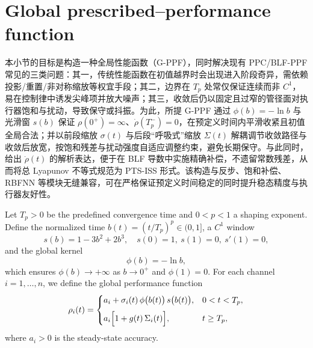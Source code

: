 \documentclass[pdflatex,sn-mathphys-num]{sn-jnl}%
\theoremstyle{thmstyleone}%
\theoremstyle{thmstyletwo}%
\theoremstyle{thmstylethree}%
\begin{document}
\section{Global prescribed–performance function}


本小节的目标是构造一种全局性能函数（G-PPF），同时解决现有 PPC/BLF-PPF 常见的三类问题：其一，传统性能函数在初值越界时会出现进入阶段奇异，需依赖投影/重置/非对称缩放等权宜手段；其二，边界在 $T_p$ 处常仅保证连续而非 $C^1$，易在控制律中诱发尖峰项并放大噪声；其三，收敛后仍以固定且过窄的管径面对执行器饱和与扰动，导致保守或抖振。为此，所提 G-PPF 通过 $\phi(b)=-\ln b$ 与光滑窗 $s(b)$ 保证 $\rho(0^+)=\infty$、$\dot\rho(T_p^-)=0$，在预定义时间内平滑收紧且初值全局合法；并以前段缩放 $\sigma(t)$ 与后段“呼吸式”缩放 $\Sigma(t)$ 解耦调节收敛路径与收敛后放宽，按饱和残差与扰动强度自适应调整约束，避免长期保守。与此同时，给出 $\dot\rho(t)$ 的解析表达，便于在 BLF 导数中实施精确补偿，不遗留常数残差，从而将总 Lyapunov 不等式规范为 PTS-ISS 形式。该构造与反步、饱和补偿、RBFNN 等模块无缝兼容，可在严格保证预定义时间稳定的同时提升稳态精度与执行器友好性。

Let $T_p>0$ be the predefined convergence time and $0<p<1$ a shaping exponent.
Define the normalized time $b(t)=(t/T_p)^p\in(0,1]$, a $C^1$ window
\begin{equation}\label{eq:gppf-window}
s(b)=1-3b^2+2b^3,\quad s(0)=1,\ s(1)=0,\ s'(1)=0,
\end{equation}
and the global kernel
\begin{equation}\label{eq:gppf-kernel}
\phi(b) = -\ln b,
\end{equation}
which ensures $\phi(b)\to+\infty$ as $b\to0^+$ and $\phi(1)=0$.
For each channel $i=1,\dots,n$, we define the global performance function
\begin{equation}\label{eq:gppf-def}
\rho_i(t)=
\begin{cases}
\displaystyle a_i + \sigma_i(t)\,\phi\bigl(b(t)\bigr)\,s\bigl(b(t)\bigr), & 0<t<T_p,\\[6pt]
\displaystyle a_i\Bigl[1 + g(t)\,\Sigma_i(t)\Bigr], & t\ge T_p,
\end{cases}
\end{equation}
where $a_i>0$ is the steady-state accuracy.
\end{document}
